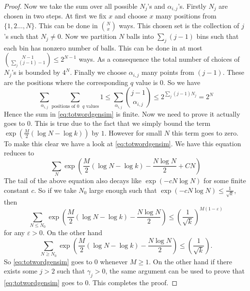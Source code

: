 \documentclass[12pt]{article}
\numberwithin{equation}{section}
\numberwithin{equation}{section}
\theoremstyle{definition}
\renewcommand{\1}{\bf 1}
\begin{document}
\begin{proof}
Now we take the sum over all possible $N_{j}$'s and $\alpha_{i,j}$'s. Firstly $N_{j}$ are chosen in two steps. At first we fix $x$ and choose $x$ many positions from $\{ 1,2\ldots, N \}$. This can be done in $\binom{N}{x}$ ways. This chosen set is the collection of $j$'s such that $N_{j}\neq 0$. Now we partition $N$ balls into $\sum_{j}(j-1)$ bins such that each bin has nonzero number of balls. This can be done in at most $\binom{N-1}{\sum_{j}(j-1)-1}\le 2^{N-1}$ ways. As a consequence the total number of choices of $N_{j}$'s is bounded by $4^{N}$. Finally we choose  $\alpha_{i,j}$ many points from $(j-1)$. These are the positions where the corresponding $q$ value is $0$. So we have 
\begin{equation}
\sum_{\alpha_{i,j}} \sum_{\text{positions of $0$ $q$ values}}1\le \sum_{\alpha_{i,j}} \binom{j-1}{\alpha_{i,j}}\le 2^{\sum_{j}(j-1)N_{j}}= 2^{N}
\end{equation} 
Hence the sum in \eqref{eq:totwordgensim} is finite. Now we need to prove it actually goes to $0$. This is true due to the fact that we simply bound the term $\exp\left( \frac{M}{2}\left( \log N - \log k \right) \right)$ by $1$. However for small $N$ this term goes to zero. To make this clear we have a look at \eqref{eq:totwordgensim}. We have this equation reduces to  
\begin{equation}
\sum_{N} \exp\left( \frac{M}{2}(\log N -\log k) - \frac{N\log N}{2} + CN \right)
\end{equation}
The tail of the above equation also decays like $\exp\left( - c N\log N \right)$ for some finite constant $c$. So if we take $N_0$ large enough such that $\exp\left( -c N\log N \right)\le \frac{1}{\sqrt{k}}$, then $$\sum_{N\le N_{0}}\exp\left(\frac{M}{2}\left( \log N - \log k\right) - \frac{N\log N}{2}\right)\le \left(\frac{1}{\sqrt{k}}\right)^{M(1-\varepsilon)} $$ 
for any $\varepsilon >0$. On the other hand 
$$
\sum_{N\ge N_{0}} \exp\left( \frac{M}{2}\left( \log N - \log k \right) - \frac{N\log N}{2} \right)\le \left( \frac{1}{\sqrt{k}} \right).
$$
So \eqref{eq:totwordgensim} goes to $0$ whenever $M\ge 1$. On the other hand if there exists some $j>2$ such that $\gamma_{j}>0$, the same argument can be used to prove that \eqref{eq:totwordgensim} goes to $0$. This completes the proof. 



\end{proof}
\end{document}
